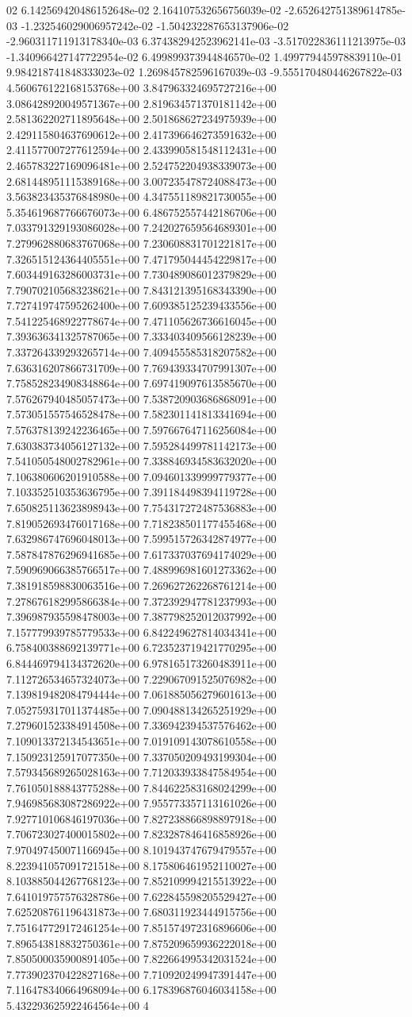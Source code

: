 02	6.142569420486152648e-02	2.164107532656756039e-02	-2.652642751389614785e-03	-1.232546029006957242e-02	-1.504232287653137906e-02	-2.960311711913178340e-03	6.374382942523962141e-03	-3.517022836111213975e-03	-1.340966427147722954e-02	6.499899373944846570e-02	1.499779445978839110e-01	9.984218741848333023e-02	1.269845782596167039e-03	-9.555170480446267822e-03
4.560676122168153768e+00	3.847963324695727216e+00	3.086428920049571367e+00	2.819634571370181142e+00	2.581362202711895648e+00	2.501868627234975939e+00	2.429115804637690612e+00	2.417396646273591632e+00	2.411577007277612594e+00	2.433990581548112431e+00	2.465783227169096481e+00	2.524752204938339073e+00	2.681448951115389168e+00	3.007235478724088473e+00	3.563823435376848980e+00	4.347551189821730055e+00	5.354619687766676073e+00	6.486752557442186706e+00	7.033791329193086028e+00	7.242027659564689301e+00	7.279962880683767068e+00	7.230608831701221817e+00	7.326515124364405551e+00	7.471795044454229817e+00	7.603449163286003731e+00	7.730489086012379829e+00	7.790702105683238621e+00	7.843121395168343390e+00	7.727419747595262400e+00	7.609385125239433556e+00	7.541225468922778674e+00	7.471105626736616045e+00	7.393636341325787065e+00	7.333403409566128239e+00	7.337264339293265714e+00	7.409455585318207582e+00	7.636316207866731709e+00	7.769439334707991307e+00	7.758528234908348864e+00	7.697419097613585670e+00	7.576267940485057473e+00	7.538720903686868091e+00	7.573051557546528478e+00	7.582301141813341694e+00	7.576378139242236465e+00	7.597667647116256084e+00	7.630383734056127132e+00	7.595284499781142173e+00	7.541050548002782961e+00	7.338846934583632020e+00	7.106380606201910588e+00	7.094601339999779377e+00	7.103352510353636795e+00	7.391184498394119728e+00	7.650825113623898943e+00	7.754317272487536883e+00	7.819052693476017168e+00	7.718238501177455468e+00	7.632986747696048013e+00	7.599515726342874977e+00	7.587847876296941685e+00	7.617337037694174029e+00	7.590969066385766517e+00	7.488996981601273362e+00	7.381918598830063516e+00	7.269627262268761214e+00	7.278676182995866384e+00	7.372392947781237993e+00	7.396987935598478003e+00	7.387798252012037992e+00	7.157779939785779533e+00	6.842249627814034341e+00	6.758400388692139771e+00	6.723523719421770295e+00	6.844469794134372620e+00	6.978165173260483911e+00	7.112726534657324073e+00	7.229067091525076982e+00	7.139819482084794444e+00	7.061885056279601613e+00	7.052759317011374485e+00	7.090488134265251929e+00	7.279601523384914508e+00	7.336942394537576462e+00	7.109013372134543651e+00	7.019109143078610558e+00	7.150923125917077350e+00	7.337050209493199304e+00	7.579345689265028163e+00	7.712033933847584954e+00	7.761050188843775288e+00	7.844622583168024299e+00	7.946985683087286922e+00	7.955773357113161026e+00	7.927710106846197036e+00	7.827238866898897918e+00	7.706723027400015802e+00	7.823287846416858926e+00	7.970497450071166945e+00	8.101943747679479557e+00	8.223941057091721518e+00	8.175806461952110027e+00	8.103885044267768123e+00	7.852109994215513922e+00	7.641019757576328786e+00	7.622845598205529427e+00	7.625208761196431873e+00	7.680311923444915756e+00	7.751647729172461254e+00	7.851574972316896606e+00	7.896543818832750361e+00	7.875209659936222018e+00	7.850500035900891405e+00	7.822664995342031524e+00	7.773902370422827168e+00	7.710920249947391447e+00	7.116478340664968094e+00	6.178396876046034158e+00	5.432293625922464564e+00	4